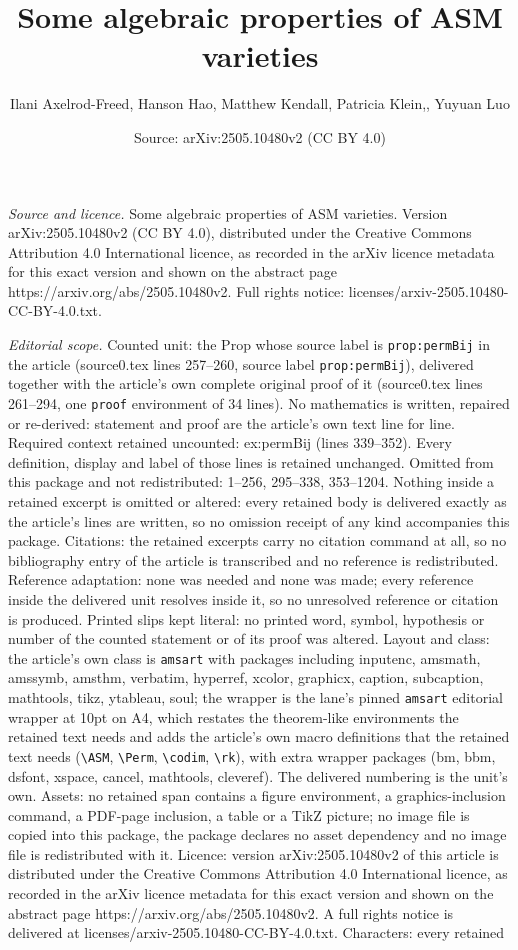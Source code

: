 \documentclass[10pt,a4paper]{amsart}
\title[Some algebraic properties of ASM varieties]{Some algebraic properties of ASM varieties}
\author{Ilani Axelrod-Freed, Hanson Hao, Matthew Kendall, Patricia Klein,, Yuyuan Luo}
\date{Source: arXiv:2505.10480v2 (CC BY 4.0)}
\begin{document}
\maketitle

\noindent\emph{Source and licence.} Some algebraic properties of ASM varieties. Version arXiv:2505.10480v2 (CC BY 4.0), distributed under the Creative Commons Attribution 4.0 International licence, as recorded in the arXiv licence metadata for this exact version and shown on the abstract page https://arxiv.org/abs/2505.10480v2. Full rights notice: licenses/arxiv-2505.10480-CC-BY-4.0.txt.\par\smallskip

\noindent\textit{Editorial scope.} Counted unit: the Prop whose source label is \texttt{prop:permBij} in the article (source0.tex lines 257--260, source label \texttt{prop:permBij}), delivered together with the article's own complete original proof of it (source0.tex lines 261--294, one \texttt{proof} environment of 34 lines). No mathematics is written, repaired or re-derived: statement and proof are the article's own text line for line. Required context retained uncounted: ex:permBij (lines 339--352). Every definition, display and label of those lines is retained unchanged. Omitted from this package and not redistributed: 1--256, 295--338, 353--1204. Nothing inside a retained excerpt is omitted or altered: every retained body is delivered exactly as the article's lines are written, so no omission receipt of any kind accompanies this package. Citations: the retained excerpts carry no citation command at all, so no bibliography entry of the article is transcribed and no reference is redistributed. Reference adaptation: none was needed and none was made; every reference inside the delivered unit resolves inside it, so no unresolved reference or citation is produced. Printed slips kept literal: no printed word, symbol, hypothesis or number of the counted statement or of its proof was altered. Layout and class: the article's own class is \texttt{amsart} with packages including inputenc, amsmath, amssymb, amsthm, verbatim, hyperref, xcolor, graphicx, caption, subcaption, mathtools, tikz, ytableau, soul; the wrapper is the lane's pinned \texttt{amsart} editorial wrapper at 10pt on A4, which restates the theorem-like environments the retained text needs and adds the article's own macro definitions that the retained text needs (\texttt{\textbackslash ASM}, \texttt{\textbackslash Perm}, \texttt{\textbackslash codim}, \texttt{\textbackslash rk}), with extra wrapper packages (bm, bbm, dsfont, xspace, cancel, mathtools, cleveref). The delivered numbering is the unit's own. Assets: no retained span contains a figure environment, a graphics-inclusion command, a PDF-page inclusion, a table or a TikZ picture; no image file is copied into this package, the package declares no asset dependency and no image file is redistributed with it. Licence: version arXiv:2505.10480v2 of this article is distributed under the Creative Commons Attribution 4.0 International licence, as recorded in the arXiv licence metadata for this exact version and shown on the abstract page https://arxiv.org/abs/2505.10480v2. A full rights notice is delivered at licenses/arxiv-2505.10480-CC-BY-4.0.txt. Characters: every retained 
\end{document}
